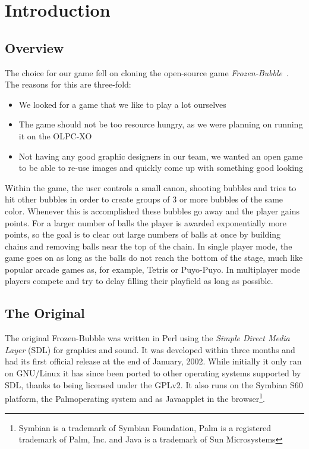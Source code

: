 \section{Introduction}
\subsection{Overview}
%
The choice for our game fell on cloning the open-source game \emph{Frozen-Bubble}~\cite{website:frozenbubble}. 
The reasons 
for this are three-fold:
%
\begin{itemize}
  \item We looked for a game that we like to play a lot ourselves
  \item The game should not be too resource hungry, as we were planning
    on running it on the OLPC-XO
  \item Not having any good graphic designers in our team, we wanted an
    open game to be able to re-use images and quickly come up with something
    good looking
\end{itemize}
%
Within the game, the user controls a small canon, shooting bubbles and tries to 
hit other bubbles in order to create groups of 3 or more bubbles of the same color. 
Whenever this is accomplished these bubbles go away and the player gains points. 
For a larger number of balls the 
player is awarded exponentially more points, so the goal is to clear out large numbers 
of balls at once by building chains and removing balls near the top of the chain.
In single player mode, the game goes on as long as the balls do not reach the bottom 
of the stage, much like popular arcade games as, for example, Tetris or Puyo-Puyo.
In multiplayer mode players compete and try to delay filling their playfield 
as long as possible.
%
\subsection{The Original}
The original Frozen-Bubble was written in Perl using the \emph{Simple Direct Media Layer} (SDL)
for graphics and sound. It was developed within three months and had its first official 
release at the end of January, 2002. While initially it only ran on GNU/Linux it has since
been ported to other operating systems supported by SDL, thanks to being licensed under the GPLv2.
It also runs on the Symbian\trademark
S60 platform, the Palm\registered operating system and as Java\trademark applet in the 
browser\footnote{Symbian is a trademark of Symbian Foundation, Palm is a registered trademark 
of Palm, Inc. and Java is a trademark of Sun Microsystems}. 

